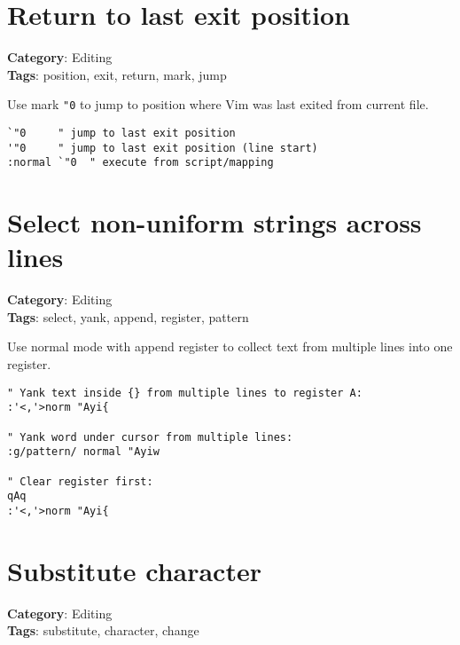 {{{{\section{Return to last exit position}

\textbf{Category}: Editing\\ \textbf{Tags}: position, exit, return, mark, jump
\vspace{0.5cm}

Use mark {\footnotesize \Verb§"0§} to jump to position where Vim was last exited from current file.

\begin{Exa*}{}
\begin{Verbatim}[fontsize=\footnotesize, breaklines, breakanywhere]
`"0     " jump to last exit position
'"0     " jump to last exit position (line start)
:normal `"0  " execute from script/mapping
\end{Verbatim}
\end{Exa*}

\section{Select non-uniform strings across lines}

\textbf{Category}: Editing\\ \textbf{Tags}: select, yank, append, register, pattern
\vspace{0.5cm}

Use normal mode with append register to collect text from multiple lines into one register.

\begin{Exa*}{}
\begin{Verbatim}[fontsize=\footnotesize, breaklines, breakanywhere]
" Yank text inside {} from multiple lines to register A:
:'<,'>norm "Ayi{

" Yank word under cursor from multiple lines:
:g/pattern/ normal "Ayiw

" Clear register first:
qAq
:'<,'>norm "Ayi{
\end{Verbatim}
\end{Exa*}

\section{Substitute character}

\textbf{Category}: Editing\\ \textbf{Tags}: substitute, character, change
\vspace{0.5cm}

}}}}
